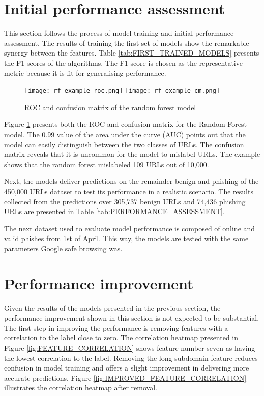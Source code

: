 \section{Initial performance assessment}
This section follows the process of model training and initial performance assessment. The results of training the first set of models show the remarkable synergy between the features. Table \ref{tab:FIRST_TRAINED_MODELS} presents the F1 scores of the algorithms. The F1-score is chosen as the representative metric because it is fit for generalising performance.

\begin{figure}[!b]
	\centering
	\texttt{[image: rf\_example\_roc.png]}
	\texttt{[image: rf\_example\_cm.png]}
	\caption{ROC and confusion matrix of the random forest model}
	\label{fig:ROC_CM_EXAMPLE}
\end{figure}

Figure \ref{fig:ROC_CM_EXAMPLE} presents both the ROC and confusion matrix for the Random Forest model. The 0.99 value of the area under the curve (AUC) points out that the model can easily distinguish between the two classes of URLs. The confusion matrix reveals that it is uncommon for the model to mislabel URLs. The example shows that the random forest mislabeled 109 URLs out of 10,000.

Next, the models deliver predictions on the remainder benign and phishing of the 450,000 URLs dataset to test its performance in a realistic scenario. The results collected from the predictions over 305,737 benign URLs and 74,436 phishing URLs are presented in Table \ref{tab:PERFORMANCE_ASSESSMENT}.



The next dataset used to evaluate model performance is composed of online and valid phishes from 1st of April. This way, the models are tested with the same parameters Google safe browsing was.


\section{Performance improvement}
Given the results of the models presented in the previous section, the performance improvement shown in this section is not expected to be substantial.
The first step in improving the performance is removing features with a correlation to the label close to zero. The correlation heatmap presented in Figure \ref{fig:FEATURE_CORRELATION} shows feature number seven as having the lowest correlation to the label. Removing the long subdomain feature reduces confusion in model training and offers a slight improvement in delivering more accurate predictions. Figure \ref{fig:IMPROVED_FEATURE_CORRELATION} illustrates the correlation heatmap after removal.

